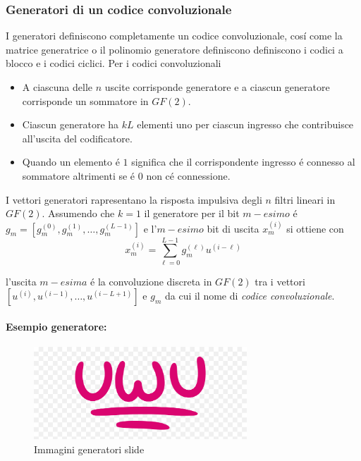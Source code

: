         \subsubsection{Generatori di un codice convoluzionale}
            I generatori definiscono completamente un codice convoluzionale, cosí come la matrice generatrice o il polinomio generatore definiscono
            definiscono i codici a blocco e i codici ciclici. Per i codici convoluzionali 
            \begin{itemize}
                \item {
                    A ciascuna delle $n$ uscite corrisponde generatore e a ciascun generatore corrisponde un sommatore in $GF(2)$.
                }
                \item {
                    Ciascun generatore ha $kL$ elementi uno per ciascun ingresso che contribuisce all'uscita del codificatore.
                }
                \item {
                    Quando un elemento é $1$ significa che il corrispondente ingresso é connesso al sommatore altrimenti se é $0$
                    non cé connessione.
                }
            \end{itemize}
            I vettori generatori rapresentano la risposta impulsiva degli $n$ filtri lineari in $GF(2)$. Assumendo che $k=1$ il 
            generatore per il bit $m-esimo$ é $g_m = [g^{(0)}_m,g^{(1)}_m,\dots,g^{(L-1)}_m]$ e l'$m-esimo$ bit di uscita $x^{(i)}_m$ 
            si ottiene con 
            \[
                x_m^{(i)} = \sum_{\ell = 0}^{L-1} g_m^{(\ell)}u^{(i-\ell)}  
            \]
            \begin{sloppypar}
                l'uscita $m-esima$ é la convoluzione discreta in $GF(2)$ tra i vettori ${[u^{(i)},u^{(i-1)},\dots,u^{(i-L+1)}]}$ e 
                $g_m$ da cui il nome di \emph{codice convoluzionale}.
            \end{sloppypar}
            \paragraph{Esempio generatore:}
            \begin{figure}[H]
                \centering
                \includegraphics[width = 8cm]{media/uwu.png}
                \caption{Immagini generatori slide}
            \end{figure}

